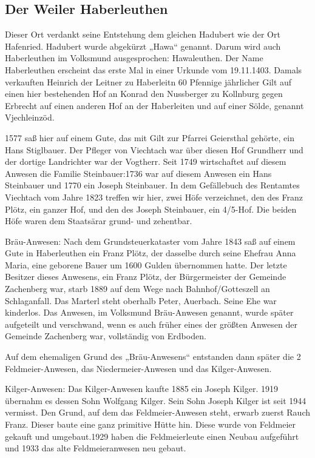 \documentclass[12pt,a4pager]{book}
\begin{document}
\subsection{Der Weiler Haberleuthen}

Dieser Ort verdankt seine Entstehung dem gleichen Hadubert wie der Ort
Hafenried. Hadubert wurde abgekürzt „Hawa“ genannt. Darum wird auch Haberleuthen
im Volksmund ausgesprochen: Hawaleuthen. Der Name Haberleuthen erscheint das
erste Mal in einer Urkunde vom 19.11.1403. Damals verkauften Heinrich der
Leitner zu Haberleitn 60 Pfennige jährlicher Gilt auf einen hier bestehenden Hof
an Konrad den Nussberger zu Kollnburg gegen Erbrecht auf einen anderen Hof an
der Haberleiten und auf einer Sölde, genannt Vjechleinzöd.

1577 saß hier auf einem Gute, das mit Gilt zur Pfarrei Geiersthal gehörte, ein
Hans Stiglbauer. Der Pfleger von Viechtach war über diesen Hof Grundherr und der
dortige Landrichter war der Vogtherr. Seit 1749 wirtschaftet auf diesem Anwesen
die Familie Steinbauer:1736 war auf diesem Anwesen ein Hans Steinbauer und 1770
ein Joseph Steinbauer. In dem Gefällebuch des Rentamtes Viechtach vom Jahre 1823
treffen wir hier, zwei Höfe verzeichnet, den des Franz Plötz, ein ganzer Hof,
und den des Joseph Steinbauer, ein 4/5-Hof. Die beiden Höfe waren dem Staatsärar
grund- und zehentbar.

Bräu-Anwesen: Nach dem Grundsteuerkataster vom Jahre 1843 saß auf einem Gute in
Haberleuthen ein Franz Plötz, der dasselbe durch seine Ehefrau Anna Maria, eine
geborene Bauer um 1600 Gulden übernommen hatte. Der letzte Besitzer dieses
Anwesens, ein Franz Plötz, der Bürgermeister der Gemeinde Zachenberg war, starb
1889 auf dem Wege nach Bahnhof/Gotteszell an Schlaganfall. Das Marterl steht
oberhalb Peter, Auerbach. Seine Ehe war kinderlos. Das Anwesen, im Volksmund
Bräu-Anwesen genannt, wurde später aufgeteilt und verschwand, wenn es auch
früher eines der größten Anwesen der Gemeinde Zachenberg war, vollständig von
Erdboden.

Auf dem ehemaligen Grund des „Bräu-Anwesens“ entstanden dann später die 2
Feldmeier-Anwesen, das Niedermeier-Anwesen und das Kilger-Anwesen.

Kilger-Anwesen: Das Kilger-Anwesen kaufte 1885 ein Joseph Kilger. 1919 übernahm
es dessen Sohn Wolfgang Kilger. Sein Sohn Joseph Kilger ist seit 1944 vermisst.
Den Grund, auf dem das Feldmeier-Anwesen steht, erwarb zuerst Rauch Franz.
Dieser baute eine ganz primitive Hütte hin. Diese wurde von Feldmeier gekauft
und umgebaut.1929 haben die Feldmeierleute einen Neubau aufgeführt und 1933 das
alte Feldmeieranwesen neu gebaut.
\end{document}
